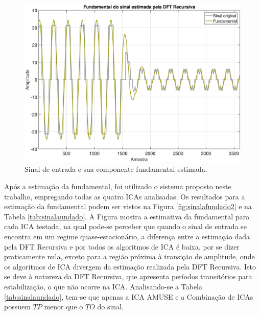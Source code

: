 \documentclass[a4paper,12pt]{monografia}
\theoremstyle{plain}
\theoremstyle{definition}
\theoremstyle{remark}
\begin{document}
\begin{figure}[!htb]
    \begin{center}
    \advance\leftskip -1.5cm
    \includegraphics[scale=0.41]{imagens/PlotSinal.eps}
    \caption{Sinal de entrada e sua componente fundamental estimada.}
    \label{fig:sinalafundado1}    
    \end{center}
\end{figure}

Após a estimação da fundamental, foi utilizado o sistema proposto neste trabalho, empregando todas as quatro ICAs analisadas. Os resultados para a estimação da fundamental podem ser vistos na Figura \ref{fig:sinalafundado2} e na Tabela \ref{tab:sinalaundado}. A Figura \label{fig:sinalafundado2}  mostra a estimativa da fundamental para cada ICA testada, na qual pode-se perceber que quando o sinal de entrada se encontra em um regime quase-estacionário, a diferença entre a estimação dada pela DFT Recursiva e por todos os algoritmos de ICA é baixa, por se dizer praticamente nula, exceto para a região próxima à transição de amplitude, onde os algoritmos de ICA divergem da estimação realizada pela DFT Recursiva. Isto se deve à natureza da DFT Recursiva, que apresenta períodos transitórios para estabilização, o que não ocorre na ICA. Analisando-se a Tabela \ref{tab:sinalaundado}, tem-se que apenas a ICA AMUSE e a Combinação de ICAs possuem $TP$ menor que o $TO$ do sinal.
\end{document}
